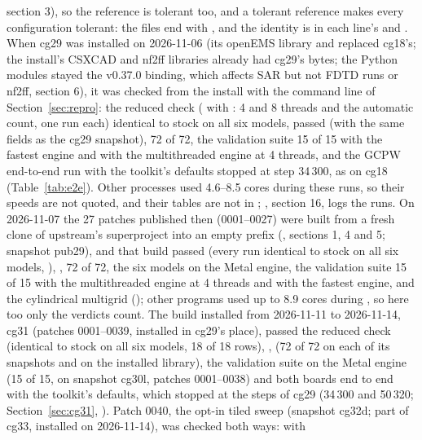 section 3), so the reference is tolerant too, and a tolerant reference makes every configuration tolerant: the files
end with , and the identity is in each line's  and
.
When cg29 was installed on 2026-11-06 (its openEMS library and  replaced cg18's; the install's CSXCAD
and nf2ff libraries already had cg29's bytes; the Python modules stayed the v0.37.0 binding, which affects SAR but
not FDTD runs or nf2ff,  section 6), it was checked from the install with the command line of
Section~\ref{sec:repro}: the reduced check ( with : 4 and 8 threads and the automatic
count, one run each) identical to stock on all six models,  passed (with the same fields as the
cg29 snapshot),  72 of 72, the validation suite 15 of 15 with the fastest engine and with the
multithreaded engine at 4 threads, and the GCPW end-to-end run with the toolkit's defaults stopped at step 34\,300, as
on cg18 (Table~\ref{tab:e2e}). Other processes used 4.6--8.5 cores during these runs, so their speeds are not quoted,
and their tables are not in ; , section 16, logs the runs.
On 2026-11-07 the 27 patches published then (0001--0027) were built from a fresh clone of upstream's superproject
into an empty prefix
(, sections 1, 4 and 5; snapshot pub29), and that build passed  (every run identical
to stock on all six models, ), ,  72 of
72, the six models on the Metal engine, the validation suite 15 of 15 with the multithreaded engine at 4 threads and
with the fastest engine, and the cylindrical multigrid (); other
programs used up to 8.9 cores during , so here too only the verdicts count.
The build installed from 2026-11-11 to 2026-11-14, cg31 (patches 0001--0039, installed in cg29's place), passed the reduced check
(identical to stock on all six models, 18 of 18 rows), ,  (72 of 72 on
each of its snapshots and on the installed library), the validation suite on the Metal engine (15 of 15, on snapshot
cg30l, patches 0001--0038) and both boards end to end with the toolkit's defaults, which stopped at the steps of cg29
(34\,300 and 50\,320; Section~\ref{sec:cg31}, ).
Patch 0040, the opt-in tiled sweep (snapshot cg32d; part of cg33, installed on 2026-11-14), was checked both ways: with

